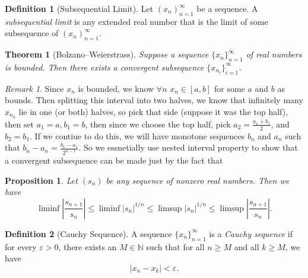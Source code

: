 \documentclass{article}
\newtheorem{theorem}{Theorem}[section]
\newtheorem{proposition}{Proposition}[section]
\theoremstyle{definition}
\newtheorem{definition}{Definition}[section]
\theoremstyle{remark}
\newtheorem{remark}{Remark}[section]
\begin{document}
\begin{definition}[Subsequential Limit]
Let  $ (x_n)^\infty_{n=1}$ be a sequence. A \textit{subsequential limit} is any extended real number that is the limit of some subsequence of  $ (x_n)^\infty_{n=1}$.

\end{definition}






\begin{theorem}[Bolzano–Weierstrass] \label{thm: Bolzano-Weierstrass}
Suppose a sequence \( \{x_n\}_{n=1}^{\infty} \) of real numbers is bounded. Then there exists a convergent subsequence \( \{x_{n_i}\}_{i=1}^{\infty} \).
\end{theorem}
\begin{remark}
Since $x_n$ is bounded, we know $\forall n$ $x_n \in [a,b]$ for some $a$ and $b$ as bounds.
Then splitting this interval into two halves, we know that infinitely many 
$x_{n_k}$ lie in one (or both) halves, so pick that side (suppose it was the top half), then set
$a_1 = a, b_1 = b$, then since we choose the top half, pick $a_2 = \frac{a_1 + b_1}{2}$, and $b_2 = b_1$.
If we contiue to do this, we will have monotone sequences $b_n$ and $a_n$ such that 
$b_n - a_n = \frac{b_1 - a_1}{2^{n-1}}$. So we essnetially use nested interval property to show
that a convergent subsequence can be made just by the fact that 
\end{remark}


\begin{proposition}
Let $(s_n)$ be any sequence of nonzero real numbers. Then we have
\[
\liminf \left| \frac{s_{n+1}}{s_n} \right| 
\leq \liminf |s_n|^{1/n} 
\leq \limsup |s_n|^{1/n} 
\leq \limsup \left| \frac{s_{n+1}}{s_n} \right|.
\]

\end{proposition}









\begin{definition}[Cauchy Sequence]\label{def:cauchy_sequence}
A sequence \( \{x_n\}_{n=1}^{\infty} \) is a \textit{Cauchy sequence} if for every \( \varepsilon > 0 \), there exists an \( M \in \mathbb{N} \) such that for all \( n \geq M \) and all \( k \geq M \), we have
\[
|x_n - x_k| < \varepsilon.
\]
\end{definition}
\end{document}

